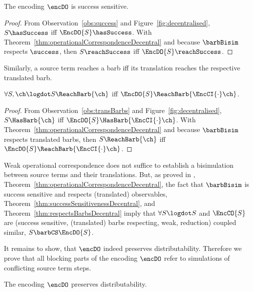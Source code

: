 \documentclass[]{eptcs}
\begin{document}
\begin{theorem}
	The encoding $ \encDO $ is success sensitive.
	\label{thm:successSensitivenessDecentral}
\end{theorem}

\begin{proof}
	From Observation~\ref{obs:success} and Figure~\ref{fig:decentralised}, $ S\hasSuccess $ iff $ \EncDO{S}\hasSuccess $. With Theorem~\ref{thm:operationalCorrespondenceDecentral} and because $ \barbBisim $ respects $ \success $, then $ S\reachSuccess $ iff $ \EncDO{S}\reachSuccess $.
\end{proof}

Similarly, a source term reaches a barb iff its translation reaches the respective translated barb.

\begin{theorem}
	$ \forall S, \ch\logdot S\ReachBarb{\ch} $ iff $ \EncDO{S}\ReachBarb{\EncCI{\cdot}\ch} $.
	\label{thm:respectsBarbsDecentral}
\end{theorem}

\begin{proof}
	From Observation~\ref{obs:transBarbs} and Figure~\ref{fig:decentralised}, $ S\HasBarb{\ch} $ iff $ \EncDO{S}\HasBarb{\EncCI{\cdot}\ch} $. With Theorem~\ref{thm:operationalCorrespondenceDecentral} and because $ \barbBisim $ respects translated barbs, then $ S\ReachBarb{\ch} $ iff $ \EncDO{S}\ReachBarb{\EncCI{\cdot}\ch} $.
\end{proof}

Weak operational correspondence does not suffice to establish a bisimulation between source terms and their translations.
But, as proved in \cite{petersGlabbeek15}, Theorem~\ref{thm:operationalCorrespondenceDecentral}, the fact that $ \barbBisim $ is success sensitive and respects (translated) observables, Theorem~\ref{thm:successSensitivenessDecentral}, and Theorem~\ref{thm:respectsBarbsDecentral} imply that $ \forall S\logdot S $ and $ \EncCO{S} $ are (success sensitive, (translated) barbs respecting, weak, reduction) coupled similar, \ie $ S \barbCS \EncDO{S} $.

It remains to show, that $ \encDO $ indeed preserves distributability. Therefore we prove that all blocking parts of the encoding $ \encDO $ refer to simulations of conflicting source term steps.

\begin{theorem}
	The encoding $ \encDO $ preserves distributability.
	\label{thm:distributability}
\end{theorem}
\end{document}
